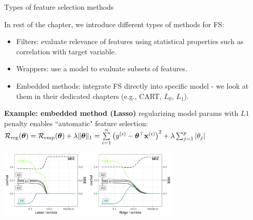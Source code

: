 \documentclass[11pt,compress,t,notes=noshow, xcolor=table]{beamer}
\begin{document}
  \begin{vbframe}{Types of feature selection methods}
 
  In rest of the chapter, we introduce different types of methods for FS:

  \begin{itemize}
    \item Filters: evaluate relevance of features using statistical properties such as correlation with target variable.
    \item Wrappers: use a model to evaluate subsets of features. 
    \item Embedded methods: integrate FS directly into specific model - we look at them in their dedicated chapters (e.g., CART, $L_0$, $L_1$).
  \end{itemize}

      \textbf{Example: embedded method (Lasso)} regularizing model params with $L1$ penalty %
      enables ``automatic" feature selection:
      \vspace{-0.28cm}
      $ \mathcal{R}_{\text{reg}}(\bm{\theta}) = \mathcal{R}_{\text{emp}}(\bm{\theta}) + \lambda \|\bm{\theta}\|_1 = \sum\limits_{i=1}^n \left(y^{(i)} - \bm{\theta}^\top \mathbf{x}^{(i)} \right)^2 +\lambda \sum_{j=1}^p |\theta_j| $
\vspace{0.1cm}
  \begin{center}
  \includegraphics[width=0.65\textwidth]{figure/regu_example_lasso_ridge.png}
  \end{center}


  \end{vbframe}



  \endlecture
\end{document}
